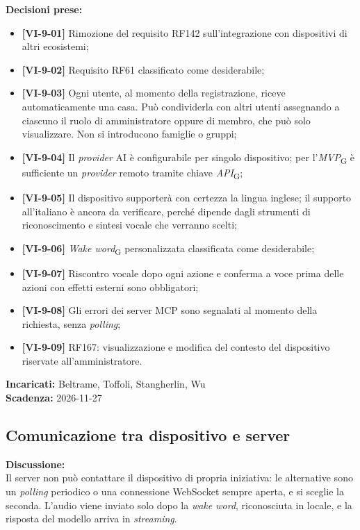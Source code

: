 \documentclass[12pt,a4paper]{article}
\newcommand{\vnum}{9}                     %
\newcommand{\gl}[1]{\emph{#1}\textsubscript{\scriptsize G}}       %
\newcommand{\tightlist}{\setlength{\itemsep}{1pt}\setlength{\parskip}{0pt}}
\begin{document}
\textbf{Decisioni prese:}
\begin{itemize}
\tightlist
\item[$\checkmark$] \textbf{[VI-\vnum-01]} Rimozione del requisito RF142 sull'integrazione con dispositivi di altri ecosistemi;
\item[$\checkmark$] \textbf{[VI-\vnum-02]} Requisito RF61 classificato come desiderabile;
\item[$\checkmark$] \textbf{[VI-\vnum-03]} Ogni utente, al momento della registrazione, riceve automaticamente una casa. Può condividerla con altri utenti assegnando a ciascuno il ruolo di amministratore oppure di membro, che può solo visualizzare. Non si introducono famiglie o gruppi;
\item[$\checkmark$] \textbf{[VI-\vnum-04]} Il \emph{provider} AI è configurabile per singolo dispositivo; per l'\gl{MVP} è sufficiente un \emph{provider} remoto tramite chiave \gl{API};
\item[$\checkmark$] \textbf{[VI-\vnum-05]} Il dispositivo supporterà con certezza la lingua inglese; il supporto all'italiano è ancora da verificare, perché dipende dagli strumenti di riconoscimento e sintesi vocale che verranno scelti;
\item[$\checkmark$] \textbf{[VI-\vnum-06]} \gl{Wake word} personalizzata classificata come desiderabile;
\item[$\checkmark$] \textbf{[VI-\vnum-07]} Riscontro vocale dopo ogni azione e conferma a voce prima delle azioni con effetti esterni sono obbligatori;
\item[$\checkmark$] \textbf{[VI-\vnum-08]} Gli errori dei server MCP sono segnalati al momento della richiesta, senza \emph{polling};
\item[$\checkmark$] \textbf{[VI-\vnum-09]} RF167: visualizzazione e modifica del contesto del dispositivo riservate all'amministratore.
\end{itemize}

\textbf{Incaricati:} Beltrame, Toffoli, Stangherlin, Wu\\
\textbf{Scadenza:} 2026-11-27

\hypertarget{odg-2}{%
\subsection{Comunicazione tra dispositivo e server}}
\textbf{Discussione:}\\
Il server non può contattare il dispositivo di propria iniziativa: le alternative sono un \emph{polling} periodico o una connessione WebSocket sempre aperta, e si sceglie la seconda. L'audio viene inviato solo dopo la \emph{wake word}, riconosciuta in locale, e la risposta del modello arriva in \emph{streaming}.
\end{document}

